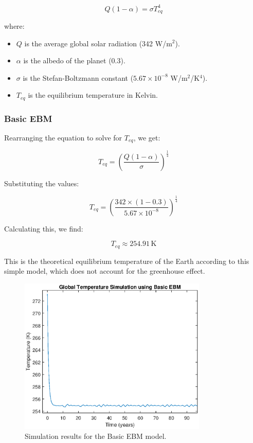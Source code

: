 \documentclass[12pt]{article}
\begin{document}
\begin{equation}
Q(1 - \alpha) = \sigma T_{eq}^4
\end{equation}

where:
\begin{itemize}
    \item $Q$ is the average global solar radiation (342 W/m$^2$).
    \item $\alpha$ is the albedo of the planet (0.3).
    \item $\sigma$ is the Stefan-Boltzmann constant ($5.67 \times 10^{-8}$ W/m$^2$/K$^4$).
    \item $T_{eq}$ is the equilibrium temperature in Kelvin.
\end{itemize}

\subsubsection{Basic EBM}

Rearranging the equation to solve for $T_{eq}$, we get:

\begin{equation}
T_{eq} = \left( \frac{Q(1 - \alpha)}{\sigma} \right)^{\frac{1}{4}}
\end{equation}

Substituting the values:

\begin{equation}
T_{eq} = \left( \frac{342 \times (1 - 0.3)}{5.67 \times 10^{-8}} \right)^{\frac{1}{4}}
\end{equation}

Calculating this, we find:

\begin{equation}
T_{eq} \approx 254.91 \, \text{K}
\end{equation}

This is the theoretical equilibrium temperature of the Earth according to this simple model, which does not account for the greenhouse effect.


\begin{figure}[ht]
\centering
\includegraphics[width=0.8\textwidth]{ebm_basic.eps}
\caption{Simulation results for the Basic EBM model.}
\label{fig:basicEBM}
\end{figure}
\end{document}
